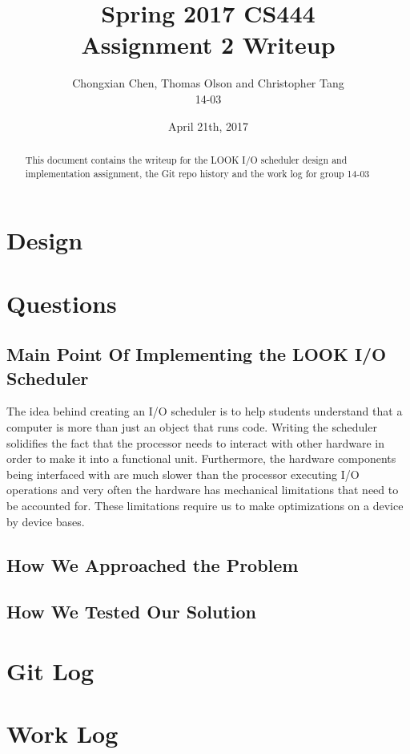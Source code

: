 \documentclass[10pt,onecolumn,journal,draftclsnofoot,letterpaper]{IEEEtran}
\begin{document}
\begin{titlepage}
  \title{Spring 2017 CS444\\Assignment 2 Writeup}
  \author{Chongxian Chen, Thomas Olson and Christopher Tang\\14-03}
  \date{April 21th, 2017}
  \maketitle
  \vspace{4cm}
  \begin{abstract}
  \noindent This document contains the writeup for the LOOK I/O scheduler design and implementation assignment, the Git repo history and the work log for group 14-03
 \end{abstract}
    \bigskip
    \bigskip
    \bigskip
    \bigskip
    \bigskip



\end{titlepage}

\section{Design}

\section{Questions}

\subsection{Main Point Of Implementing the LOOK I/O Scheduler}
The idea behind creating an I/O scheduler is to help students understand that a computer is more than just an object that runs code. Writing the scheduler solidifies the fact that the processor needs to interact with other hardware in order to make it into a functional unit. Furthermore, the hardware components being interfaced with are much slower than the processor executing I/O operations and very often the hardware has mechanical limitations that need to be accounted for. These limitations require us to make optimizations on a device by device bases.

\subsection{How We Approached the Problem}

\subsection{How We Tested Our Solution}

\section{Git Log}

\section{Work Log}
\end{document}
